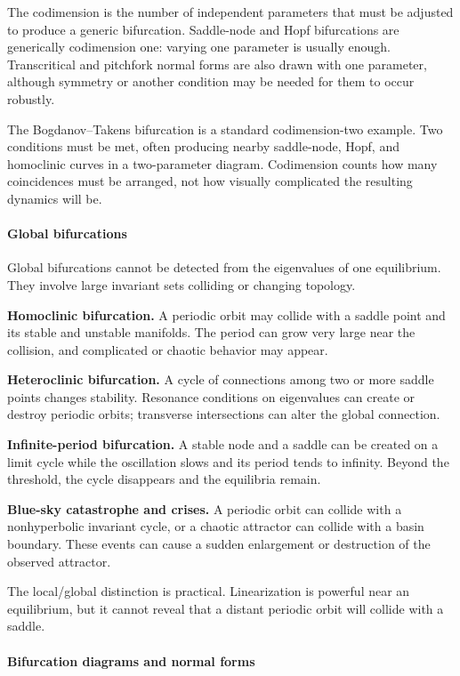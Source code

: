 The codimension is the number of independent parameters that must be adjusted to produce a generic bifurcation. Saddle-node and Hopf bifurcations are generically codimension one: varying one parameter is usually enough. Transcritical and pitchfork normal forms are also drawn with one parameter, although symmetry or another condition may be needed for them to occur robustly.

The Bogdanov--Takens bifurcation is a standard codimension-two example. Two conditions must be met, often producing nearby saddle-node, Hopf, and homoclinic curves in a two-parameter diagram. Codimension counts how many coincidences must be arranged, not how visually complicated the resulting dynamics will be.

\paragraph{Global bifurcations}

Global bifurcations cannot be detected from the eigenvalues of one equilibrium. They involve large invariant sets colliding or changing topology.

\textbf{Homoclinic bifurcation.} A periodic orbit may collide with a saddle point and its stable and unstable manifolds. The period can grow very large near the collision, and complicated or chaotic behavior may appear.

\textbf{Heteroclinic bifurcation.} A cycle of connections among two or more saddle points changes stability. Resonance conditions on eigenvalues can create or destroy periodic orbits; transverse intersections can alter the global connection.

\textbf{Infinite-period bifurcation.} A stable node and a saddle can be created on a limit cycle while the oscillation slows and its period tends to infinity. Beyond the threshold, the cycle disappears and the equilibria remain.

\textbf{Blue-sky catastrophe and crises.} A periodic orbit can collide with a nonhyperbolic invariant cycle, or a chaotic attractor can collide with a basin boundary. These events can cause a sudden enlargement or destruction of the observed attractor.

The local/global distinction is practical. Linearization is powerful near an equilibrium, but it cannot reveal that a distant periodic orbit will collide with a saddle.

\paragraph{Bifurcation diagrams and normal forms}

